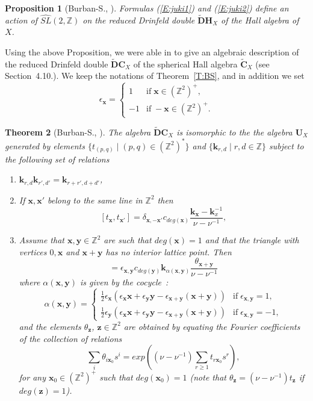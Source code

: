 \documentclass[a4paper,10pt]{amsart}
\def\Z{\mathbb{Z}}
\def\H{\mathbf{H}}
\def\U{\mathbf{U}}
\def\a{\alpha}
\def\x{\mathbf{x}}
\def\y{\mathbf{y}}
\def\z{\mathbf{z}}
\newtheorem{theo}{\bf{Theorem}}[section]
\newtheorem{prop}[theo]{Proposition}
\numberwithin{equation}{section}
\begin{document}
{\begin{prop}[Burban-S., \cite{BS}]\label{P:BSauto} Formulas (\ref{E:juki1}) and (\ref{E:juki2}) define an action of $\widehat{SL}(2,\Z)$ on the reduced Drinfeld double $\widetilde{\mathbf{D}}\H_{X}$ of the Hall algebra of $X$.\end{prop}

\vspace{.15in}

Using the above Proposition, we were able in \cite{BS} to give an algebraic description of the reduced Drinfeld double $\widetilde{\mathbf{D}}\mathbf{C}_X$ of the spherical Hall algebra $\widetilde{\mathbf{C}}_X$ (see Section~4.10.). We keep the notations of Theorem~\ref{T:BS}, and in addition we set
$$\epsilon_\x=\begin{cases} 1 & \text{if}\; \x \in (\Z^2)^+,\\ -1 & \text{if}\; -\x \in (\Z^2)^+.\end{cases}$$

\vspace{.1in}

\begin{theo}[Burban-S., \cite{BS}]\label{T:BSauto} The algebra $\widetilde{\mathbf{D}}\mathbf{C}_X$ is isomorphic to the the algebra $\U_X$ generated by elements $\{{t}_{(p,q)}\;|\; (p,q) \in (\Z^2)^*\}$ and $\{\mathbf{k}_{r,d}\;|\; r,d \in \Z\}$ subject to the following set of relations
\begin{enumerate}
\item[i)] $\mathbf{k}_{r,d} \mathbf{k}_{r',d'}=\mathbf{k}_{r+r',d+d'}$,
\item[i)] If $\x,\x'$ belong to the same line in $\Z^2$ then
$$[{t}_\x,{t}_{\x'}]=\delta_{\x,-\x'}c_{deg(\x)}\frac{\mathbf{k}_{\x}-\mathbf{k}_{x}^{-1}}{\nu-\nu^{-1}},$$
\item[ii)] Assume that $\x,\y \in \Z^2$ are such that $deg(\x)=1$ and that
the triangle with vertices $0, \x$ and $\x+\y$ has no interior lattice point. Then
\begin{equation}
[t_\y,t_{\x}]=\epsilon_{\x,\y}c_{deg(\y)}\mathbf{k}_{\a(\x,\y)}\frac{\theta_{\x+\y}}{\nu-\nu^{-1}}
\end{equation}
where $\a(\x,\y)$ is given by the cocycle~:
\begin{equation}\label{E:alphard}
\a(\x,\y)=\begin{cases}
\frac{1}{2}\epsilon_\x(\epsilon_{\x}\x+\epsilon_{\y}\y-\epsilon_{\x+\y}(\x+\y)) & \text{if}\; \epsilon_{\x,\y}=1,\\
\frac{1}{2}\epsilon_\y(\epsilon_{\x}\x+\epsilon_{\y}\y-\epsilon_{\x+\y}(\x+\y)) & \text{if}\; \epsilon_{\x,\y}=-1,
\end{cases}
\end{equation}
and the elements $\theta_{\z}$, $\z \in \Z^2$ are obtained by equating the Fourier
 coefficients of the collection of relations
\begin{equation}
\sum_i \theta_{i\x_0}s^i=exp((\nu-\nu^{-1})\sum_{r \geq 1}t_{r\x_0}s^r),
\end{equation}
for any $\x_0 \in (\Z^2)^+$ such that $deg(\x_0)=1$ (note that $\theta_{\z}=(\nu-\nu^{-1})t_{\z}$ if $deg(\z)=1$).
\end{enumerate}
\end{theo}

}
\end{document}
